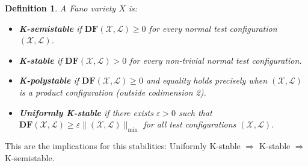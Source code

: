 \documentclass[12pt,twoside,a4paper]{report}
\newtheorem{definition}{Definition}[section]
\newcommand{\lsheaf}{\ensuremath{\mathcal L }}
\begin{document}
\begin{definition}
  A Fano variety $X$ is:
  \begin{itemize}
    \item \textbf{K-semistable} if $\mathbf{DF}(\mathcal{X},\lsheaf) \geq 0$ for every
      normal test configuration $(\mathcal{X},\lsheaf)$.
    \item \textbf{K-stable} if $\mathbf{DF}(\mathcal{X},\lsheaf) > 0$ for every
      non-trivial normal test configuration.
    \item \textbf{K-polystable} if $\mathbf{DF}(\mathcal{X},\lsheaf) \geq 0$ and equality
      holds precisely when $(\mathcal{X},\lsheaf)$ is a product configuration
      (outside codimension 2).
    \item \textbf{Uniformly K-stable} if there exists $\varepsilon > 0$
      such that $\mathbf{DF}(\mathcal{X},\lsheaf) \geq \varepsilon \lVert (\mathcal{X},\lsheaf)
      \rVert_{\min}$ for all test configurations $(\mathcal{X},\lsheaf)$.
  \end{itemize}
\end{definition}
This are the implications for this stabilities: Uniformly K-stable $\Rightarrow$ K-stable $\Rightarrow$ K-semistable.
\end{document}
